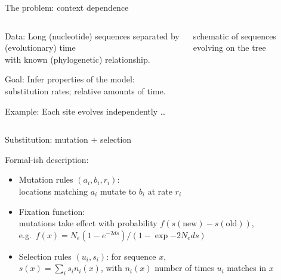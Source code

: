 \documentclass[smaller]{beamer}
\begin{document}
\begin{frame}{The problem: context dependence}

  \begin{columns}[c]
    \begin{column}{.4\textwidth}

      {\struct Data:} Long (nucleotide) sequences separated by (evolutionary) time \\
        with known (phylogenetic) relationship.

        \vspace{2em}

      {\struct Goal:} Infer properties of the model:\\
        substitution rates; relative amounts of time.

        \vspace{2em}

      {\struct Example:} Each site evolves independently \ldots

    \end{column}
    \begin{column}{.6\textwidth}

      schematic of sequences evolving on the tree

    \end{column}
  \end{columns}

\end{frame}


\begin{frame}{Substitution: mutation $+$ selection}

  {\struct Formal-ish description:}

  \begin{itemize}

    \item {\newthing Mutation} rules $(a_i,b_i,r_i)$: \\
      locations matching $a_i$ mutate to $b_i$ at rate $r_i$

    \item {\newthing Fixation} function: \\
      mutations take effect with probability $f(s(\text{new}) - s(\text{old}))$, \\
      e.g.\ $f(x) = N_e (1-e^{-2 ds})/(1-\exp{-2 N_e ds})$

    \item {\newthing Selection} rules $(u_i,s_i)$: for sequence $x$,\\
      $s(x) = \sum_i s_i n_i(x)$, with $n_i(x)$ number of times $u_i$ matches in $x$
      

  \end{itemize}

\end{frame}
\end{document}
